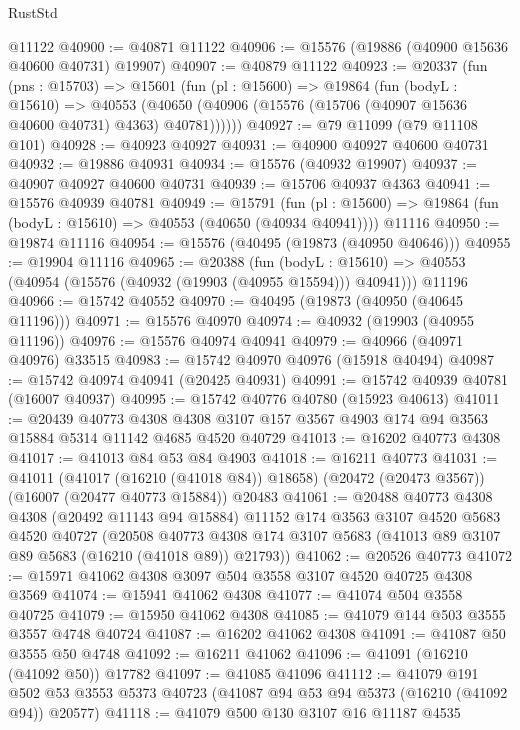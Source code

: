 \begin{lexlean}{RustStd}
\begin{coremodule}
    @11122
@40900 := @40871 @11122
@40906 := @15576 (@19886 (@40900 @15636 @40600 @40731) @19907)
@40907 := @40879 @11122
@40923 := @20337
    (fun (pns : @15703) =>
    @15601
      (fun (pl : @15600) =>
      @19864
        (fun (bodyL : @15610) =>
        @40553 (@40650 (@40906 (@15576 (@15706 (@40907 @15636 @40600 @40731) @4363) @40781))))))
@40927 := @79 @11099 (@79 @11108 @101)
@40928 := @40923 @40927
@40931 := @40900 @40927 @40600 @40731
@40932 := @19886 @40931
@40934 := @15576 (@40932 @19907)
@40937 := @40907 @40927 @40600 @40731
@40939 := @15706 @40937 @4363
@40941 := @15576 @40939 @40781
@40949 := @15791
    (fun (pl : @15600) => @19864 (fun (bodyL : @15610) => @40553 (@40650 (@40934 @40941))))
    @11116
@40950 := @19874 @11116
@40954 := @15576 (@40495 (@19873 (@40950 @40646)))
@40955 := @19904 @11116
@40965 := @20388
    (fun (bodyL : @15610) => @40553 (@40954 (@15576 (@40932 (@19903 (@40955 @15594))) @40941)))
    @11196
@40966 := @15742 @40552
@40970 := @40495 (@19873 (@40950 (@40645 @11196)))
@40971 := @15576 @40970
@40974 := @40932 (@19903 (@40955 @11196))
@40976 := @15576 @40974 @40941
@40979 := @40966 (@40971 @40976) @33515
@40983 := @15742 @40970 @40976 (@15918 @40494)
@40987 := @15742 @40974 @40941 (@20425 @40931)
@40991 := @15742 @40939 @40781 (@16007 @40937)
@40995 := @15742 @40776 @40780 (@15923 @40613)
@41011 := @20439
    @40773
    @4308
    @4308
    @3107
    @157
    @3567
    @4903
    @174
    @94
    @3563
    @15884
    @5314
    @11142
    @4685
    @4520
    @40729
@41013 := @16202 @40773 @4308
@41017 := @41013 @84 @53 @84 @4903
@41018 := @16211 @40773
@41031 := @41011
    (@41017 (@16210 (@41018 @84)) @18658)
    (@20472 (@20473 @3567))
    (@16007 (@20477 @40773 @15884))
    @20483
@41061 := @20488
    @40773
    @4308
    @4308
    (@20492 @11143 @94 @15884)
    @11152
    @174
    @3563
    @3107
    @4520
    @5683
    @4520
    @40727
    (@20508 @40773 @4308 @174 @3107 @5683 (@41013 @89 @3107 @89 @5683 (@16210 (@41018 @89)) @21793))
@41062 := @20526 @40773
@41072 := @15971 @41062 @4308 @3097 @504 @3558 @3107 @4520 @40725 @4308 @3569
@41074 := @15941 @41062 @4308
@41077 := @41074 @504 @3558 @40725
@41079 := @15950 @41062 @4308
@41085 := @41079 @144 @503 @3555 @3557 @4748 @40724
@41087 := @16202 @41062 @4308
@41091 := @41087 @50 @3555 @50 @4748
@41092 := @16211 @41062
@41096 := @41091 (@16210 (@41092 @50)) @17782
@41097 := @41085 @41096
@41112 := @41079
    @191
    @502
    @53
    @3553
    @5373
    @40723
    (@41087 @94 @53 @94 @5373 (@16210 (@41092 @94)) @20577)
@41118 := @41079 @500 @130 @3107 @16 @11187 @4535

\end{coremodule}
\end{lexlean}
